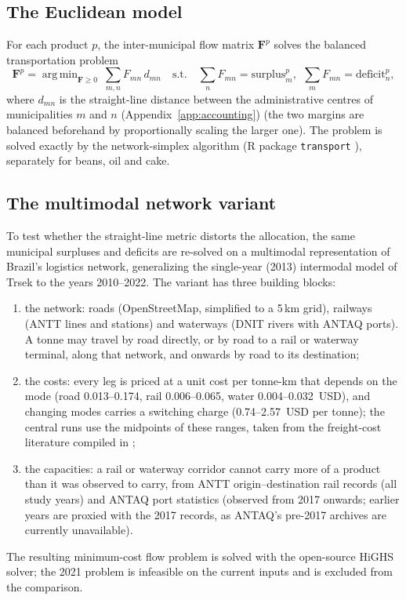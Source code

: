 \documentclass[pdflatex,sn-nature]{sn-jnl}%
\DeclareMathOperator*{\argmin}{arg\,min}
\begin{document}
\subsection{The Euclidean model}\label{subsubsec:euclid}
For each product
$p$, the inter-municipal flow matrix $\mathbf{F}^p$ solves the balanced
transportation problem
\begin{equation}\label{eq:ot}
  \mathbf{F}^{p}=\argmin_{\mathbf{F}\ge0}\ \sum_{m,n}F_{mn}\,d_{mn}
  \quad\text{s.t.}\quad
  \sum_{n}F_{mn}=\text{surplus}^p_m,\ \
  \sum_{m}F_{mn}=\text{deficit}^p_n,
\end{equation}
where $d_{mn}$ is the straight-line distance between the administrative
centres of municipalities $m$ and $n$ (Appendix~\ref{app:accounting}) (the two margins are balanced beforehand by
proportionally scaling the larger one). The problem is solved exactly by
the network-simplex algorithm (R package \texttt{transport}
\cite{schuhmacher2023transport}), separately for beans, oil and cake.

\subsection{The multimodal network variant}\label{subsubsec:multimode}
To test whether the straight-line metric distorts the allocation, the
same municipal surpluses and deficits are re-solved on a multimodal
representation of Brazil's logistics network, generalizing the
single-year (2013) intermodal model of Trsek \cite{trsek2022} to the
years 2010--2022. The variant has three building blocks:
\begin{enumerate}
\item the network: roads (OpenStreetMap, simplified to a 5\,km grid),
railways (ANTT lines and stations) and waterways (DNIT rivers with
ANTAQ ports). A tonne may travel by road directly, or by road to a
rail or waterway terminal, along that network, and onwards by road to
its destination;
\item the costs: every leg is priced at a unit cost per tonne-km that
depends on the mode (road 0.013--0.174, rail 0.006--0.065, water
0.004--0.032~USD), and changing modes carries a switching charge
(0.74--2.57~USD per tonne); the central runs use the midpoints of
these ranges, taken from the freight-cost literature compiled in
\cite{trsek2022};
\item the capacities: a rail or waterway corridor cannot carry more of
a product than it was observed to carry, from ANTT
origin--destination rail records (all study years) and ANTAQ port
statistics (observed from 2017 onwards; earlier years are proxied with
the 2017 records, as ANTAQ's pre-2017 archives are currently
unavailable).
\end{enumerate}
The resulting minimum-cost flow problem is solved with the open-source
HiGHS solver; the 2021 problem is infeasible on the current inputs and
is excluded from the comparison.
\end{document}
